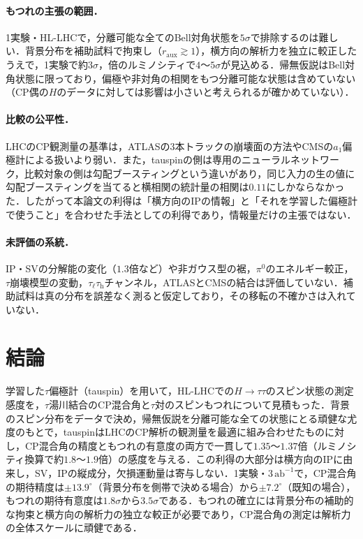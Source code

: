 \documentclass[paper=a4,fontsize=10pt,jafontsize=10pt,line_length=44zw,number_of_lines=46]{jlreq}
\newcommand{\tauh}{\tau_{\mathrm{h}}}
\newcommand{\taul}{\tau_{\ell}}
\newcommand{\abinv}{\,\mathrm{ab}^{-1}}
\begin{document}
\paragraph{もつれの主張の範囲．}1実験・HL-LHCで，分離可能な全てのBell対角状態を$5\sigma$で排除するのは難しい．背景分布を補助試料で拘束し（$r_{\mathrm{aux}}\gtrsim1$），横方向の解析力を独立に較正したうえで，1実験で約$3\sigma$，倍のルミノシティで$4$〜$5\sigma$が見込める．帰無仮説はBell対角状態に限っており，偏極や非対角の相関をもつ分離可能な状態は含めていない（CP偶の$H$のデータに対しては影響は小さいと考えられるが確かめていない）．

\paragraph{比較の公平性．}LHCのCP観測量の基準は，ATLASの3本トラックの崩壊面の方法やCMSの$a_1$偏極計による扱いより弱い．また，tauspinの側は専用のニューラルネットワーク，比較対象の側は勾配ブースティングという違いがあり，同じ入力の生の値に勾配ブースティングを当てると横相関の統計量の相関は$0.11$にしかならなかった．したがって本論文の利得は「横方向のIPの情報」と「それを学習した偏極計で使うこと」を合わせた手法としての利得であり，情報量だけの主張ではない．

\paragraph{未評価の系統．}IP・SVの分解能の変化（$1.3$倍など）や非ガウス型の裾，$\pi^0$のエネルギー較正，$\tau$崩壊模型の変動，$\taul\tauh$チャンネル，ATLASとCMSの結合は評価していない．補助試料は真の分布を誤差なく測ると仮定しており，その移転の不確かさは入れていない．

\section{結論}\label{sec:concl}

学習した$\tau$偏極計（tauspin）を用いて，HL-LHCでの$H\to\tau\tau$のスピン状態の測定感度を，$\tau$湯川結合のCP混合角と$\tau$対のスピンもつれについて見積もった．背景のスピン分布をデータで決め，帰無仮説を分離可能な全ての状態にとる頑健な尤度のもとで，tauspinはLHCのCP解析の観測量を最適に組み合わせたものに対し，CP混合角の精度ともつれの有意度の両方で一貫して$1.35$〜$1.37$倍（ルミノシティ換算で約$1.8$〜$1.9$倍）の感度を与える．この利得の大部分は横方向のIPに由来し，SV，IPの縦成分，欠損運動量は寄与しない．1実験・$3\abinv$で，CP混合角の期待精度は$\pm13.9^\circ$（背景分布を側帯で決める場合）から$\pm7.2^\circ$（既知の場合），もつれの期待有意度は$1.8\sigma$から$3.5\sigma$である．もつれの確立には背景分布の補助的な拘束と横方向の解析力の独立な較正が必要であり，CP混合角の測定は解析力の全体スケールに頑健である．
\end{document}
